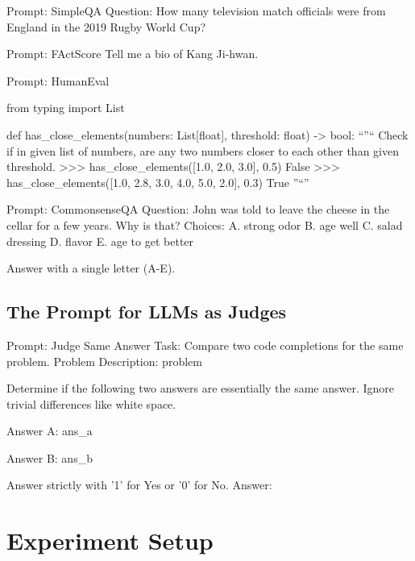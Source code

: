 \documentclass[11pt]{article}
\theoremstyle{plain}
\theoremstyle{definition}
\theoremstyle{remark}
\begin{document}
\begin{PromptBox}{Prompt: SimpleQA}
Question: How many television match officials were from England in the 2019 Rugby World Cup?
\end{PromptBox}

\begin{PromptBox}{Prompt: FActScore}
Tell me a bio of Kang Ji-hwan.
\end{PromptBox}
\begin{PromptBox}{Prompt: HumanEval}

from typing import List


def has_close_elements(numbers: List[float], threshold: float) -> bool:
    ``''`` Check if in given list of numbers, are any two numbers closer to each other than
    given threshold.
    >>> has_close_elements([1.0, 2.0, 3.0], 0.5)
    False
    >>> has_close_elements([1.0, 2.8, 3.0, 4.0, 5.0, 2.0], 0.3)
    True
    ''``''

\end{PromptBox}

\begin{PromptBox}{Prompt: CommonsenseQA}
Question: John was told to leave the cheese in the cellar for a few years.  Why is that?
Choices:
A. strong odor
B. age well
C. salad dressing
D. flavor
E. age to get better

Answer with a single letter (A-E).
\end{PromptBox}

\subsection{The Prompt for LLMs as Judges}\label{app:prompt for LLMs as Judges}
\begin{PromptBox}{Prompt: Judge Same Answer}
Task: Compare two code completions for the same problem.
Problem Description:
{problem}

Determine if the following two answers are essentially the same answer.
Ignore trivial differences like white space.

Answer A:
{ans_a}

Answer B:
{ans_b}

Answer strictly with '1' for Yes or '0' for No.
Answer:


\end{PromptBox}


\section{Experiment Setup}
\end{document}

